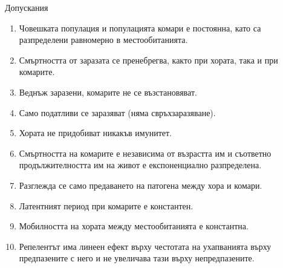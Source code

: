 \begin{frame}[t]{Допускания}
  \begin{small}
    \begin{enumerate}
      \item Човешката популация и популацията комари е постоянна, като са разпределени равномерно в местообитанията.
      \item Смъртността от заразата се пренебрегва, както при хората, така и при комарите.
      \item Веднъж заразени, комарите не се възстановяват.
      \item Само податливи се заразяват (няма свръхзаразяване).
      \item Хората не придобиват никакъв имунитет.
      \item Смъртността на комарите е независима от възрастта им и съответно продължителността им на живот е експоненциално разпределена.
      \item Разглежда се само предаването на патогена между хора и комари.
      \item Латентният период при комарите е константен.
      \item Мобилността на хората между местообитанията е константна.
      \item Репелентът има линеен ефект върху честотата на ухапванията върху предпазените с него и не увеличава тази върху непредпазените.
    \end{enumerate}
  \end{small}
\end{frame}

